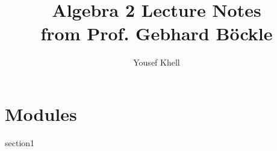 \documentclass[a4paper]{report}
\title{\vspace{-2cm} Algebra 2 Lecture Notes\\from Prof. Gebhard Böckle}
\author{Yousef Khell}
\begin{document}
\maketitle

\chapter{Modules}
{section1}
\end{document}

